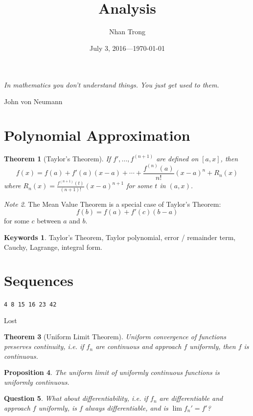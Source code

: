 \documentclass[12pt]{article}
\title{Analysis}
\author{Nhan Trong}
\date{July 3, 2016---\today}                                           %
\theoremstyle{plain}
\newtheorem{theorem}{Theorem}
\newtheorem{proposition}[theorem]{Proposition}
\newtheorem{question}[theorem]{Question}
\theoremstyle{definition}
\newtheorem{keywords}{Keywords}
\theoremstyle{remark}
\newtheorem{note}[theorem]{Note}
\begin{document}
\sloppy
\maketitle

\epigraph{\textit{In mathematics you don't understand things. You just get used to them.}}{John von Neumann}

\part{Polynomial Approximation}

\begin{theorem}[Taylor's Theorem]
If $f', \ldots, f^{(n+1)}$ are defined on $[a, x]$, then
$$f(x) = f(a) + f'(a)(x - a) + \cdots + \frac{f^{(n)}(a)}{n!}(x - a)^n + R_n(x)$$
where $R_n(x) = \frac{f^{(n+1)}(t)}{(n+1)!}(x - a)^{n+1}$ for some $t$ in $(a, x)$.
\end{theorem}

\begin{note}
The Mean Value Theorem is a special case of Taylor's Theorem:
$$f(b) = f(a) + f'(c)(b - a)$$
for some $c$ between $a$ and $b$.
\end{note}

\begin{keywords}
Taylor's Theorem, Taylor polynomial, error / remainder term, Cauchy, Lagrange, integral form.
\end{keywords}

\part{Sequences}

\epigraph{\texttt{4 8 15 16 23 42}}{Lost}

\begin{theorem}[Uniform Limit Theorem]
Uniform convergence of functions preserves continuity, i.e. if $f_n$ are continuous and approach $f$ uniformly, then $f$ is continuous.
\end{theorem}

\begin{proposition}
The uniform limit of uniformly continuous functions is uniformly continuous.
\end{proposition}

\begin{question}
What about differentiability, i.e. if $f_n$ are differentiable and approach $f$ uniformly, is $f$ always differentiable, and is $\lim f_n' = f'$?
\end{question}
\end{document}
